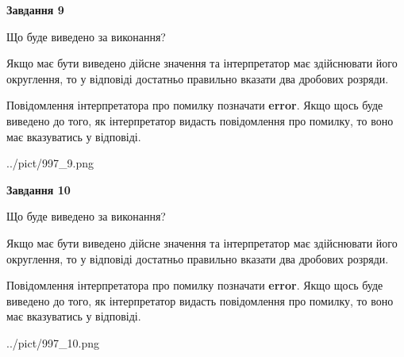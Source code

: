 \documentclass[12pt, ukrainian]{article}
\begin{document}
{\begin {Large}
{\begin {center}\textbf{Завдання 9}\end {center}}\par
Що буде виведено за виконання? \par

Якщо має бути виведено дійсне значення та інтерпретатор має здійснювати його округлення, 
то у відповіді достатньо правильно вказати два дробових розряди.

Повідомлення інтерпретатора про помилку позначати \textbf{error}.
Якщо щось буде виведено до того, як інтерпретатор видасть повідомлення про помилку, 
то воно має вказуватись у відповіді. \par

\begin{center}
	{../pict/997_9.png}
\end{center}
\newpage

{\begin {center}\textbf{Завдання 10}\end {center}}\par
Що буде виведено за виконання? \par

Якщо має бути виведено дійсне значення та інтерпретатор має здійснювати його округлення, 
то у відповіді достатньо правильно вказати два дробових розряди.

Повідомлення інтерпретатора про помилку позначати \textbf{error}.
Якщо щось буде виведено до того, як інтерпретатор видасть повідомлення про помилку, 
то воно має вказуватись у відповіді. \par

\begin{center}
	{../pict/997_10.png}
\end{center}
\newpage

\end {Large}}
\end{document}
